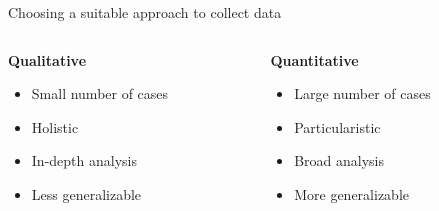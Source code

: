 \documentclass[10pt, aspectratio=169]{beamer}
\begin{document}


\begin{frame}{Choosing a suitable approach to collect data}

\begin{columns}
\begin{column}{0.5\textwidth}
\begin{center}
\textbf{Qualitative} \vspace{0.3cm}
\begin{itemize}
    \item Small number of cases \vspace{0.3cm}
    \item Holistic \vspace{0.3cm}
    \item In-depth analysis \vspace{0.3cm}
    \item Less generalizable \vspace{0.3cm}
\end{itemize}
\end{center}
\end{column}

\begin{column}{0.5\textwidth}
\begin{center}
\textbf{Quantitative} \vspace{0.3cm}

\begin{itemize}
    \item Large number of cases \vspace{0.3cm}
    \item Particularistic \vspace{0.3cm}
    \item Broad analysis \vspace{0.3cm}
    \item More generalizable \vspace{0.3cm}
\end{itemize}
\end{center}
\end{column}
\end{columns}

\end{frame}
\end{document}
